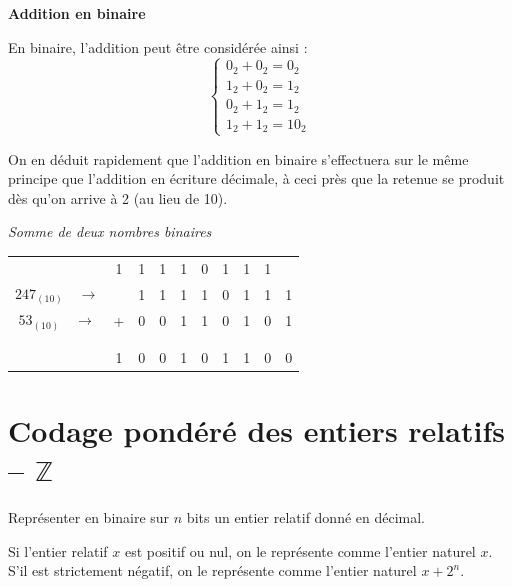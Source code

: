 \documentclass[10pt,fleqn]{article} %
\begin{document}
\begin{resultat}
\textbf{Addition en binaire}

En binaire, l'addition peut être considérée ainsi :
$$\left\{\begin{array}{l}
0_2+0_2=0_2\\
1_2+0_2=1_2\\
0_2+1_2=1_2\\
1_2+1_2=10_2
\end{array}
\right.$$

On en déduit rapidement que l'addition en binaire s'effectuera sur le même principe que l'addition en écriture décimale, à ceci près que la retenue se produit dès qu'on arrive à 2 (au lieu de 10).
\end{resultat}
\begin{exemple}
\textit{Somme de deux nombres binaires}

\begin{center}
\begin{tabular}{p{2cm}|c|c|c|c|c|c|c|c|c|}
\multicolumn{1}{c}{}  & 
\multicolumn{1}{c}{1} & 
\multicolumn{1}{c}{1} & 
\multicolumn{1}{c}{1} & 
\multicolumn{1}{c}{1} & 
\multicolumn{1}{c}{0} & 
\multicolumn{1}{c}{1} & 
\multicolumn{1}{c}{1} & 
\multicolumn{1}{c}{1} &
\multicolumn{1}{c}{}  \\
\cline{3-10}
\multicolumn{1}{c}{$247_{(10)} \quad \rightarrow $} &  & 1 & 1 & 1 & 1 & 0 & 1 & 1 & 1 \\
\cline{3-10}
\multicolumn{1}{c}{$53_{(10)} \quad \rightarrow $} & + & 0 & 0 & 1 & 1 & 0 & 1 & 0 & 1 \\
\cline{3-10}
\multicolumn{10}{c}{} \\
\cline{2-10}
\multicolumn{10}{c}{} \\
\cline{2-10}
& 1 & 0 & 0 & 1 & 0 & 1 & 1 & 0 & 0 \\
\cline{2-10}
\end{tabular}
\end{center}

\end{exemple}

\section{Codage pondéré des entiers relatifs -- $\mathbb{Z}$}

\begin{savoir}
Représenter en binaire sur $n$ bits un entier relatif donné en décimal.

Si l’entier relatif $x$ est positif ou nul, on le représente comme l’entier naturel $x$. S’il est
strictement négatif, on le représente comme l’entier naturel $x + 2^n$.
\end{savoir}
\end{document}
